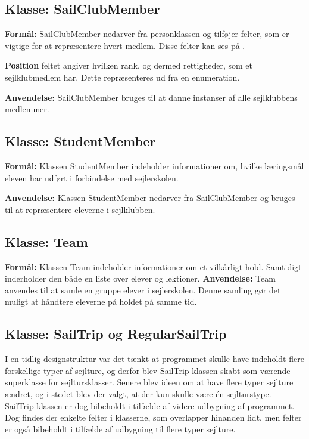 \subsection*{Klasse: SailClubMember}

\textbf{Formål:}
SailClubMember nedarver fra personklassen og tilføjer felter, som er vigtige for at repræsentere hvert medlem.
Disse felter kan ses på .

\textbf{Position} feltet angiver hvilken rank, og dermed rettigheder, som et sejlklubmedlem har. 
Dette repræsenteres ud fra en enumeration.

\textbf{Anvendelse:}
SailClubMember bruges til at danne instanser af alle sejlklubbens medlemmer. 

\subsection*{Klasse: StudentMember}
\textbf{Formål:}
Klassen StudentMember indeholder informationer om, hvilke læringsmål eleven har udført i forbindelse med sejlerskolen. 

\textbf{Anvendelse:}
Klassen StudentMember nedarver fra SailClubMember og bruges til at repræsentere eleverne i sejlklubben.

\subsection*{Klasse: Team}

\textbf{Formål:}
Klassen Team indeholder informationer om et vilkårligt hold. 
Samtidigt inderholder den både en liste over elever og lektioner.
\textbf{Anvendelse:}
Team anvendes til at samle en gruppe elever i sejlerskolen.
Denne samling gør det muligt at håndtere eleverne på holdet på samme tid.

\subsection*{Klasse: SailTrip og RegularSailTrip}

I en tidlig designstruktur var det tænkt at programmet skulle have indeholdt flere forskellige typer af sejlture, og derfor blev SailTrip-klassen skabt som værende superklasse for sejltursklasser. 
Senere blev ideen om at have flere typer sejlture ændret, og i stedet blev der valgt, at der kun skulle være én sejlturstype. 
SailTrip-klassen er dog bibeholdt i tilfælde af videre udbygning af programmet.
Dog findes der enkelte felter i klasserne, som overlapper hinanden lidt, men felter er også bibeholdt i tilfælde af udbygning til flere typer sejlture.

